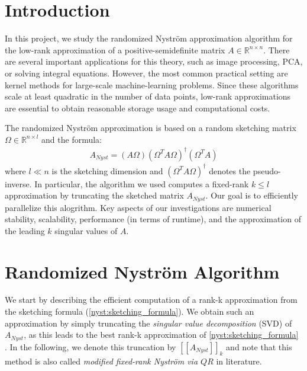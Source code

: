\documentclass{article}
\date{\today}
\theoremstyle{definition}
\begin{document}
\hypersetup{pageanchor=false}


\clearpage
\thispagestyle{empty}
\tableofcontents

\clearpage
\hypersetup{pageanchor=true} %
\setcounter{page}{1}

\section{Introduction}
In this project, we study the randomized Nyström approximation algorithm for the
low-rank approximation of a positive-semidefinite matrix $A\in \mathbb{R}^{n
\times n}$. There are several important applications for this theory, such as
image processing, PCA, or solving integral equations. However, the most common
practical setting are kernel methods for large-scale machine-learning problems.
Since these algorithms scale at least quadratic in the number of data points,
low-rank approximations are essential to obtain reasonable storage usage and
computational costs.\newline

The randomized Nyström approximation is based on a random sketching matrix
$\Omega \in \mathbb{R}^{n \times l}$ and the formula:
\begin{align}
    \label{nyst:sketching_formula}
    A_{Nyst} = (A \Omega) (\Omega^T A \Omega)^\dagger (\Omega^T A)
\end{align}
where $l \ll n$ is the sketching dimension and $(\Omega^T A \Omega)^\dagger$
denotes the pseudo-inverse. In particular, the algorithm we used computes a
fixed-rank $k \leq l$ approximation by truncating the sketched matrix
$A_{Nyst}$. Our goal is to efficiently parallelize this alogrithm. Key aspects
of our investigations are numerical stability, scalability, performance (in
terms of runtime), and the approximation of the leading $k$ singular values of
$A$.\newline

\section{Randomized Nyström Algorithm}\label{sec:rand_nystrom_alg}

We start by describing the efficient computation of a rank-k approximation from
the sketching formula (\ref{nyst:sketching_formula}). We obtain such an
approximation by simply truncating the \textit{singular value decomposition}
(SVD) of $A_{Nyst}$, as this leads to the best rank-k approximation of
\eqref{nyst:sketching_formula} \cite{tropp2017fixedrank}. In the following, we
denote this truncation by $[\![A_{Nyst}]\!]_k$ and note that this method is also
called \textit{modified fixed-rank Nyström via $QR$} in literature.\newline
\end{document}
